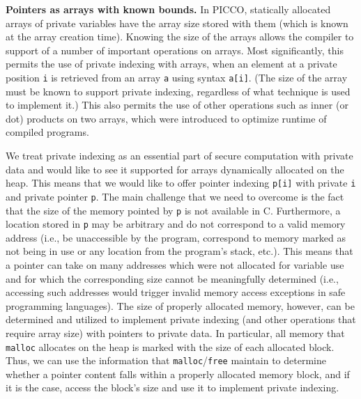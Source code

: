 \documentclass[11pt]{article}
\begin{document}
\medskip \noindent \textbf{Pointers as arrays with known bounds.} In PICCO,
statically allocated arrays of private variables have the array size stored
with them (which is known at the array creation time). Knowing the size of
the arrays allows the compiler to support of a number of important
operations on arrays. Most significantly, this permits the use of private
indexing with arrays, when an element at a private position \texttt{i} is
retrieved from an array \texttt{a} using syntax \texttt{a[i]}. (The size of
the array must be known to support private indexing, regardless of what
technique is used to implement it.) This also permits the use of other
operations such as inner (or dot) products on two arrays, which were
introduced to optimize runtime of compiled programs.

We treat private indexing as an essential part of secure computation with
private data and would like to see it supported for arrays dynamically
allocated on the heap. This means that we would like to offer pointer
indexing \texttt{p[i]} with private \texttt{i} and private pointer
\texttt{p}. The main challenge that we need to overcome is the fact that the
size of the memory pointed by \texttt{p} is not available in C. Furthermore,
a location stored in \texttt{p} may be arbitrary and do not correspond to a
valid memory address (i.e., be unaccessible by the program, correspond to
memory marked as not being in use or any location from the program's stack,
etc.). This means that a pointer can take on many addresses which were not
allocated for variable use and for which the corresponding size cannot be
meaningfully determined (i.e., accessing such addresses would trigger
invalid memory access exceptions in safe programming languages). The size of
properly allocated memory, however, can be determined and utilized to
implement private indexing (and other operations that require array size)
with pointers to private data. In particular, all memory that
\texttt{malloc} allocates on the heap is marked with the size of each
allocated block. Thus, we can use the information that
\texttt{malloc}/\texttt{free} maintain to determine whether a pointer
content falls within a properly allocated memory block, and if it is the
case, access the block's size and use it to implement private indexing.
\end{document}
